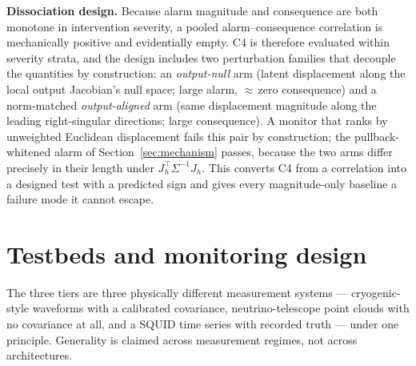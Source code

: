 \documentclass[10pt,twocolumn]{extarticle}
\begin{document}
\textbf{Dissociation design.} Because alarm magnitude and consequence are both
monotone in intervention severity, a pooled alarm--consequence correlation is
mechanically positive and evidentially empty. C4 is therefore evaluated within
severity strata, and the design includes two perturbation families that
decouple the quantities by construction: an \emph{output-null} arm (latent
displacement along the local output Jacobian's null space; large alarm,
$\approx$\,zero consequence) and a norm-matched \emph{output-aligned} arm
(same displacement magnitude along the leading right-singular directions;
large consequence). A monitor that ranks by unweighted Euclidean displacement
fails this pair by construction; the pullback-whitened alarm of
Section~\ref{sec:mechanism} passes, because the two arms differ precisely in
their length under $J_h^{\top}\Sigma^{-1}J_h$. This converts C4 from a correlation into a designed test with a
predicted sign and gives every magnitude-only baseline a failure mode it
cannot escape.

\section{Testbeds and monitoring design}

The three tiers are three physically different measurement systems ---
cryogenic-style waveforms with a calibrated covariance, neutrino-telescope
point clouds with no covariance at all, and a SQUID time series with recorded
truth --- under one principle. Generality is claimed across measurement
regimes, not across architectures.
\end{document}
